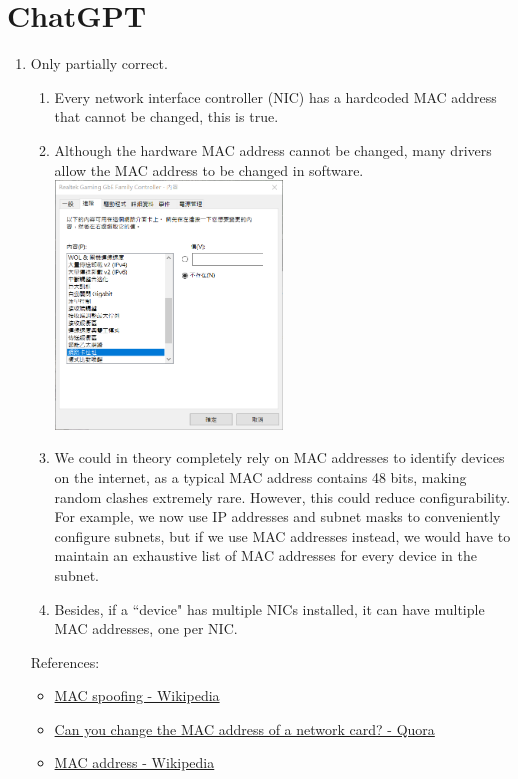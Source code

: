 \documentclass[12pt, a4paper]{article}
\begin{document}
  \section{ChatGPT}
  \begin{enumerate}
    \item Only partially correct.
    \begin{enumerate}
      \item Every network interface controller (NIC) has a hardcoded MAC
        address that cannot be changed, this is true.
      \item Although the hardware MAC address cannot be changed, many drivers
        allow the MAC address to be changed in software.\\
        \includegraphics[width=0.5\textwidth]{na_p2-1_driver_mac_address.png}
      \item We could in theory completely rely on MAC addresses to identify
        devices on the internet, as a typical MAC address contains 48 bits,
        making random clashes extremely rare. However, this could reduce
        configurability. For example, we now use IP addresses and subnet masks
        to conveniently configure subnets, but if we use MAC addresses instead,
        we would have to maintain an exhaustive list of MAC addresses for every
        device in the subnet.
      \item Besides, if a ``device" has multiple NICs installed, it can have
        multiple MAC addresses, one per NIC.
    \end{enumerate}

    References:
    \begin{itemize}
      \item \href{https://en.wikipedia.org/wiki/MAC_spoofing}{MAC spoofing - Wikipedia}
      \item \href{https://www.quora.com/Can-you-change-the-MAC-address-of-a-network-card}{Can you change the MAC address of a network card? - Quora}
      \item \href{https://en.wikipedia.org/wiki/MAC_address}{MAC address - Wikipedia}
    \end{itemize}


\end{enumerate}
\end{document}

